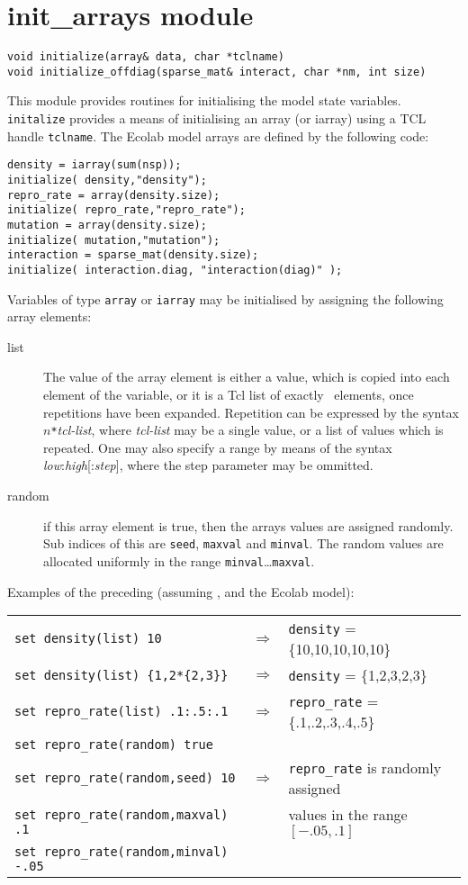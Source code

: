 \section{init\_arrays module}\label{init_arrays}

\begin{verbatim}
void initialize(array& data, char *tclname)
void initialize_offdiag(sparse_mat& interact, char *nm, int size)
\end{verbatim}

This module provides routines for initialising the model state
variables. {\tt initalize} provides a means of initialising an array
(or iarray) using a TCL handle {\tt tclname}. The Ecolab model arrays
are defined by the following code:
\begin{verbatim}
density = iarray(sum(nsp));
initialize( density,"density");
repro_rate = array(density.size);
initialize( repro_rate,"repro_rate");
mutation = array(density.size);
initialize( mutation,"mutation");
interaction = sparse_mat(density.size);
initialize( interaction.diag, "interaction(diag)" );
\end{verbatim}

Variables of type
\verb|array| or \verb|iarray| may be initialised by assigning the
following array elements:
\begin{description}
\item[list] The value of the array element is either a value, which is
copied into each element of the variable, or it is a Tcl list of
exactly \nsp\ elements, once repetitions have been expanded.
Repetition can be expressed by the syntax $n$\verb|*|{\em tcl-list},
where {\em tcl-list} may be a single value, or a list of values which
is repeated. One may also specify a range by means of the syntax {\em
low}:{\em high}[:{\em step}], where the step parameter may be
ommitted.
\item[random] if this array element is true, then the arrays values
are assigned randomly. Sub indices of this are \verb|seed|,
\verb|maxval| and \verb|minval|. The random values are allocated
uniformly in the range \verb|minval|\ldots\verb|maxval|.
\end{description}

Examples of the preceding (assuming , and the Ecolab model):

\begin{tabular}{lcl}
\verb|set density(list) 10| &$\Longrightarrow$& \verb|density| =
\{10,10,10,10,10\}\\
\verb|set density(list) {1,2*{2,3}}| &$\Longrightarrow$& \verb|density| =
\{1,2,3,2,3\}\\
\verb|set repro_rate(list) .1:.5:.1| &$\Longrightarrow$& \verb|repro_rate|
= \{.1,.2,.3,.4,.5\}\\
\verb|set repro_rate(random) true|\\
\verb|set repro_rate(random,seed) 10|&$\Longrightarrow$&
        \verb|repro_rate| is randomly assigned\\
\verb|set repro_rate(random,maxval) .1| & & values in the range $[-.05,.1]$\\
\verb|set repro_rate(random,minval) -.05| 
\end{tabular}


